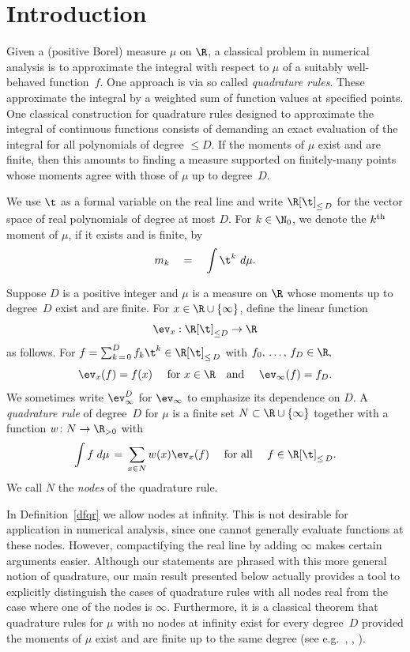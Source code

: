 \section{Introduction}\label{intro}

Given a (positive Borel) measure $\mu$ on $\R$, a classical problem in numerical analysis is to approximate the integral with respect to $\mu$ of a suitably well-behaved function~$f$. One approach is via so called \emph{quadrature rules}. These approximate the integral by a weighted sum of function values at specified points. One classical construction for quadrature rules designed to approximate the integral of continuous functions consists of demanding an exact evaluation of the integral for all polynomials of degree $\leq D$. If the moments of $\mu$ exist and are finite, then this amounts to finding a measure supported on finitely-many points whose moments agree with those of $\mu$ up to degree~$D$.

We use $\t$ as a formal variable on the real line and write $\R[\t]_{\leq\,D}$ for the vector space of real polynomials of degree at most $D$. For $k \in
\N_0$, we denote the $k^{\rm th}$ moment of $\mu$, if it exists and is finite, by
\[
m_k \quad = \quad \int \t^k \ d\mu.
\]

\begin{defi}\label{dfqr}
Suppose $D$ is a positive integer and $\mu$ is a measure on $\R$ whose moments up to degree~$D$ exist and are finite. For $x \in \R \cup \{\infty\}$, define the linear function
\[
\ev_x:\R[\t]_{\leq D} \rightarrow \R
\]
as follows. For $f = \sum_{k\,=\,0}^Df_k \t^k \in \R[\t]_{\leq\,D}$ with $f_0,\,\ldots,\,f_D\in\R,$
\[
\ev_x(f) = f(x) \quad \text{ for }x\in \R \quad \text{and } \quad \ev_{\infty}(f) = f_D.
\]
We sometimes write $\ev_{\infty}^D$ for $\ev_{\infty}$ to emphasize its dependence on $D$. A \emph{quadrature rule} of degree~$D$ for $\mu$ is a finite set $N\subset \R\cup\{\infty\}$ together with a function $w\colon N\to\R_{>0}$ with
\[
\int f \; d \mu \, = \, \sum_{x\in N}w(x) \ev_x(f) \quad \text{ for all }\quad f\in\R[\t]_{\leq\,D}.
\]
We call $N$ the \emph{nodes} of the quadrature rule.
\end{defi}


\begin{rema}
In Definition~\ref{dfqr} we allow nodes at infinity. This is not desirable for application in numerical analysis, since one cannot generally evaluate functions at these nodes. However, compactifying the real line by adding $\infty$ makes certain arguments easier. Although our statements are phrased with this more general notion of quadrature, our main result presented below actually provides a tool to explicitly distinguish the cases of quadrature rules with all nodes real from the case where one of the nodes is $\infty$. Furthermore, it is a classical theorem that quadrature rules for $\mu$ with no nodes at infinity exist for every degree~$D$ provided the moments of $\mu$ exist and are finite up to the same degree (see e.g.~\cite[Theorem~5.8]{la1}, \cite[Theorem~5.9]{la2}, \cite[Theorem~1.24]{sch}).
\end{rema}

